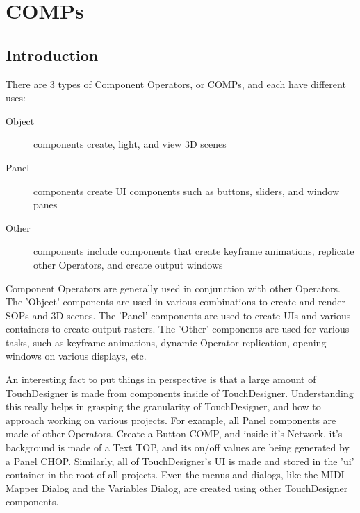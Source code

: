 \cleardoublepage
\chapter{COMPs}
\label{ch:7}


\section{Introduction}

\begin{fullwidth}
There are 3 types of Component Operators, or COMPs, and each have different uses:

\begin{description}
\item[Object] components create, light, and view 3D scenes
\item[Panel] components create UI components such as buttons, sliders, and window panes
\item[Other] components include components that create keyframe animations, replicate other Operators, and create output windows
\end{description}

Component Operators are generally used in conjunction with other Operators. The 'Object' components are used in various combinations to create and render SOPs and 3D scenes. The 'Panel' components are used to create UIs and various containers to create output rasters. The 'Other' components are used for various tasks, such as keyframe animations, dynamic Operator replication, opening windows on various displays, etc.

An interesting fact to put things in perspective is that a large amount of TouchDesigner is made from components inside of TouchDesigner. Understanding this really helps in grasping the granularity of TouchDesigner, and how to approach working on various projects. For example, all Panel components are made of other Operators. Create a Button COMP, and inside it's Network, it's background is made of a Text TOP, and its on/off values are being generated by a Panel CHOP. Similarly, all of TouchDesigner's UI is made and stored in the 'ui' container in the root of all projects. Even the menus and dialogs, like the MIDI Mapper Dialog and the Variables Dialog, are created using other TouchDesigner components.

\end{fullwidth}

